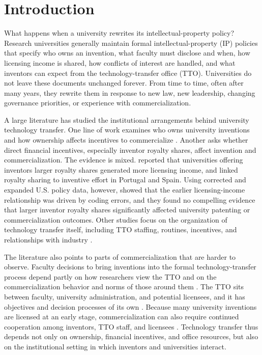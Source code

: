 \section{Introduction}

What happens when a university rewrites its intellectual-property policy? Research universities generally maintain formal intellectual-property (IP) policies that specify who owns an invention, what faculty must disclose and when, how licensing income is shared, how conflicts of interest are handled, and what inventors can expect from the technology-transfer office (TTO). Universities do not leave these documents unchanged forever. From time to time, often after many years, they rewrite them in response to new law, new leadership, changing governance priorities, or experience with commercialization.

A large literature has studied the institutional arrangements behind university technology transfer. One line of work examines who owns university inventions and how ownership affects incentives to commercialize \citep{HvideJones2018,KenneyPatton2009}. Another asks whether direct financial incentives, especially inventor royalty shares, affect invention and commercialization. The evidence is mixed. \citet{LachSchankerman2008} reported that universities offering inventors larger royalty shares generated more licensing income, and \citet{ArqueCastellsEtAl2016} linked royalty sharing to inventive effort in Portugal and Spain. Using corrected and expanded U.S. policy data, however, \citet{OuelletteTutt2020} showed that the earlier licensing-income relationship was driven by coding errors, and they found no compelling evidence that larger inventor royalty shares significantly affected university patenting or commercialization outcomes. Other studies focus on the organization of technology transfer itself, including TTO staffing, routines, incentives, and relationships with industry \citep{SiegelWaldmanLink2003,MarkmanEtAl2005,DebackereVeugelers2005}.

The literature also points to parts of commercialization that are harder to observe. Faculty decisions to bring inventions into the formal technology-transfer process depend partly on how researchers view the TTO and on the commercialization behavior and norms of those around them \citep{OwenSmithPowell2001,BercovitzFeldman2008}. The TTO sits between faculty, university administration, and potential licensees, and it has objectives and decision processes of its own \citep{JensenThursbyThursby2003}. Because many university inventions are licensed at an early stage, commercialization can also require continued cooperation among inventors, TTO staff, and licensees \citep{JensenThursby2001}. Technology transfer thus depends not only on ownership, financial incentives, and office resources, but also on the institutional setting in which inventors and universities interact.

